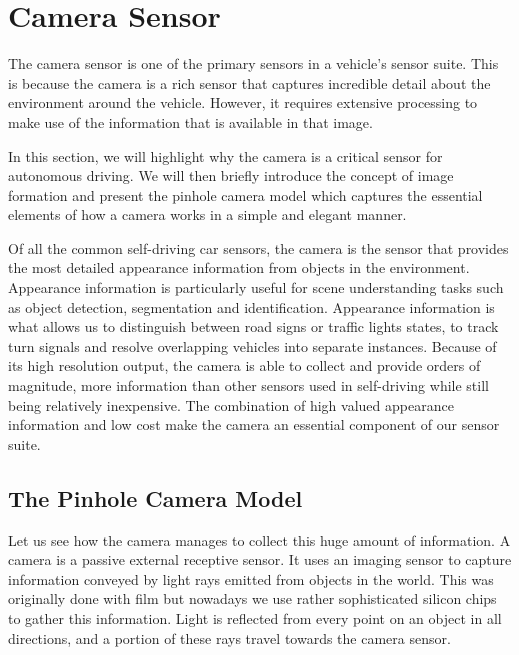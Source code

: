 \section{Camera Sensor}
\label{camera_sensor}

The camera sensor is one of the primary sensors in a vehicle's sensor suite.
This is because the camera is a rich sensor that captures incredible detail
about the environment around the vehicle. However, it requires
extensive processing to make use of the information that is
available in that image. 

In this section, we will highlight why the camera is a critical sensor
for autonomous driving. We will then briefly introduce the concept of
image formation and present the pinhole camera model
which captures the essential elements of how a camera works in a simple
and elegant manner.

Of all the common self-driving car sensors, the camera is the sensor
that provides the most detailed appearance information from objects in the environment. Appearance information
is particularly useful for scene understanding tasks such as object detection, segmentation and identification. 
Appearance information is what allows us to distinguish between road signs or
traffic lights states, to track turn signals and resolve overlapping vehicles
into separate instances. Because of its high resolution output, the camera is able to collect and provide orders of magnitude, more information than
other sensors used in self-driving while still being relatively inexpensive. The combination of high valued
appearance information and low cost make the camera an essential component of our sensor suite. 


\subsection{The Pinhole Camera Model}
\label{pinhole_model}

Let us see how the camera manages to collect this huge amount
of information. A camera is a passive
external receptive sensor. It uses an imaging sensor
to capture information conveyed by light rays emitted
from objects in the world. This was originally done with
film but nowadays we use rather sophisticated
silicon chips to gather this information. Light is reflected
from every point on an object in all directions, and a portion of these rays travel towards the camera sensor. 

